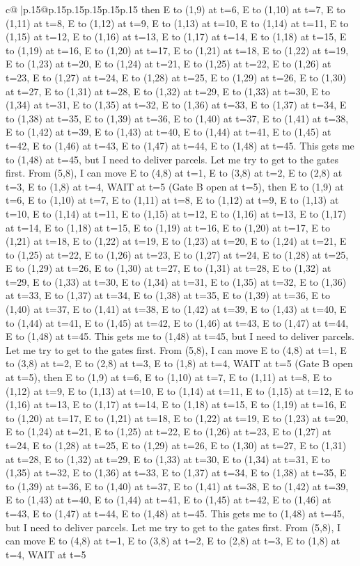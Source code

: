\documentclass{article}
\begin{document}
{\begin{supertabular}{c@{$\;$}|p{.15\linewidth}@{}p{.15\linewidth}p{.15\linewidth}p{.15\linewidth}p{.15\linewidth}p{.15\linewidth}}
{{{then E to (1,9) at t=6, E to (1,10) at t=7, E to (1,11) at t=8, E to (1,12) at t=9, E to (1,13) at t=10, E to (1,14) at t=11, E to (1,15) at t=12, E to (1,16) at t=13, E to (1,17) at t=14, E to (1,18) at t=15, E to (1,19) at t=16, E to (1,20) at t=17, E to (1,21) at t=18, E to (1,22) at t=19, E to (1,23) at t=20, E to (1,24) at t=21, E to (1,25) at t=22, E to (1,26) at t=23, E to (1,27) at t=24, E to (1,28) at t=25, E to (1,29) at t=26, E to (1,30) at t=27, E to (1,31) at t=28, E to (1,32) at t=29, E to (1,33) at t=30, E to (1,34) at t=31, E to (1,35) at t=32, E to (1,36) at t=33, E to (1,37) at t=34, E to (1,38) at t=35, E to (1,39) at t=36, E to (1,40) at t=37, E to (1,41) at t=38, E to (1,42) at t=39, E to (1,43) at t=40, E to (1,44) at t=41, E to (1,45) at t=42, E to (1,46) at t=43, E to (1,47) at t=44, E to (1,48) at t=45. This gets me to (1,48) at t=45, but I need to deliver parcels. Let me try to get to the gates first. From (5,8), I can move E to (4,8) at t=1, E to (3,8) at t=2, E to (2,8) at t=3, E to (1,8) at t=4, WAIT at t=5 (Gate B open at t=5), then E to (1,9) at t=6, E to (1,10) at t=7, E to (1,11) at t=8, E to (1,12) at t=9, E to (1,13) at t=10, E to (1,14) at t=11, E to (1,15) at t=12, E to (1,16) at t=13, E to (1,17) at t=14, E to (1,18) at t=15, E to (1,19) at t=16, E to (1,20) at t=17, E to (1,21) at t=18, E to (1,22) at t=19, E to (1,23) at t=20, E to (1,24) at t=21, E to (1,25) at t=22, E to (1,26) at t=23, E to (1,27) at t=24, E to (1,28) at t=25, E to (1,29) at t=26, E to (1,30) at t=27, E to (1,31) at t=28, E to (1,32) at t=29, E to (1,33) at t=30, E to (1,34) at t=31, E to (1,35) at t=32, E to (1,36) at t=33, E to (1,37) at t=34, E to (1,38) at t=35, E to (1,39) at t=36, E to (1,40) at t=37, E to (1,41) at t=38, E to (1,42) at t=39, E to (1,43) at t=40, E to (1,44) at t=41, E to (1,45) at t=42, E to (1,46) at t=43, E to (1,47) at t=44, E to (1,48) at t=45. This gets me to (1,48) at t=45, but I need to deliver parcels. Let me try to get to the gates first. From (5,8), I can move E to (4,8) at t=1, E to (3,8) at t=2, E to (2,8) at t=3, E to (1,8) at t=4, WAIT at t=5 (Gate B open at t=5), then E to (1,9) at t=6, E to (1,10) at t=7, E to (1,11) at t=8, E to (1,12) at t=9, E to (1,13) at t=10, E to (1,14) at t=11, E to (1,15) at t=12, E to (1,16) at t=13, E to (1,17) at t=14, E to (1,18) at t=15, E to (1,19) at t=16, E to (1,20) at t=17, E to (1,21) at t=18, E to (1,22) at t=19, E to (1,23) at t=20, E to (1,24) at t=21, E to (1,25) at t=22, E to (1,26) at t=23, E to (1,27) at t=24, E to (1,28) at t=25, E to (1,29) at t=26, E to (1,30) at t=27, E to (1,31) at t=28, E to (1,32) at t=29, E to (1,33) at t=30, E to (1,34) at t=31, E to (1,35) at t=32, E to (1,36) at t=33, E to (1,37) at t=34, E to (1,38) at t=35, E to (1,39) at t=36, E to (1,40) at t=37, E to (1,41) at t=38, E to (1,42) at t=39, E to (1,43) at t=40, E to (1,44) at t=41, E to (1,45) at t=42, E to (1,46) at t=43, E to (1,47) at t=44, E to (1,48) at t=45. This gets me to (1,48) at t=45, but I need to deliver parcels. Let me try to get to the gates first. From (5,8), I can move E to (4,8) at t=1, E to (3,8) at t=2, E to (2,8) at t=3, E to (1,8) at t=4, WAIT at t=5 }}}
\end{supertabular}}
\end{document}
